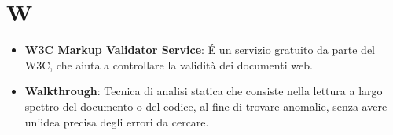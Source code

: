 \section{W}
\begin{itemize}
	\item
	\textbf{W3C Markup Validator Service}: É un servizio gratuito da parte del W3C, che aiuta a controllare la validità dei documenti web.
	\item
	\textbf{Walkthrough}: Tecnica di analisi statica che consiste nella lettura a largo spettro del documento o del codice, al fine di trovare anomalie, senza avere un'idea precisa degli errori da cercare.
\end{itemize}
